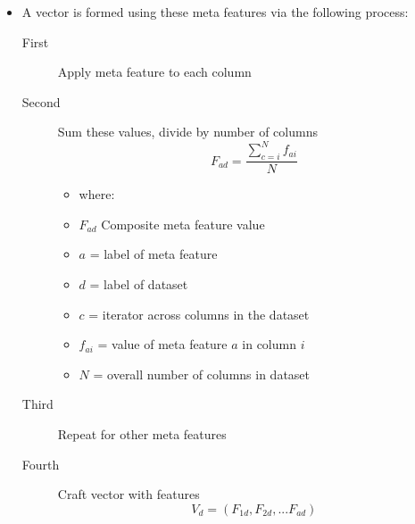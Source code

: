 \documentclass{beamer}
\begin{document}
\begin{frame}[t]
  \begin{itemize}
  \item A vector is formed using these meta features via the following
        process:
       \begin{description}
         \item[First] Apply meta feature to each column
         \item[Second] Sum these values, divide by number of columns
            $$ F_{ad} = \frac{\sum_{c=i}^{N}f_{ai}}{N}$$
           \begin{itemize}
              \item where:
              \item $F_{ad}$ Composite meta feature value
              \item $a$ = label of meta feature
              \item $d$ = label of dataset
              \item $c$ = iterator across columns in the dataset
              \item $f_{ai}$ = value of meta feature $a$ in column $i$
              \item $N$ = overall number of columns in dataset
           \end{itemize}
         \item[Third] Repeat for other meta features
         \item[Fourth] Craft vector with features
           $$V_d = (F_{1d}, F_{2d},...F_{ad})$$
       \end{description}
  \end{itemize}
\end{frame}
\end{document}
